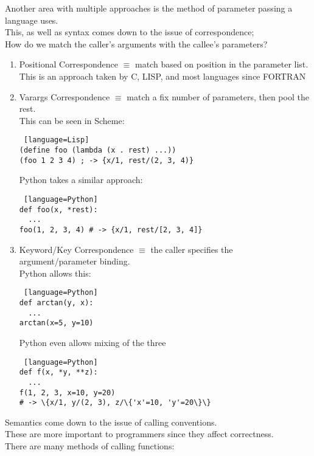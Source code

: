 \documentclass[../../lecture_notes.tex]{subfiles}
\begin{document}
Another area with multiple approaches is the method of parameter passing a language uses.\\
This, as well as syntax comes down to the issue of correspondence;\\
 How do we match the caller’s arguments with the callee’s parameters?
\begin{enumerate} [itemsep=0mm]
	\item Positional Correspondence $\equiv$ match based on position in the parameter list.\\
 		This is an approach taken by C, LISP, and most languages since FORTRAN
	\item Varargs Correspondence $\equiv$ match a fix number of parameters, then pool the rest.\\
		This can be seen in Scheme:
		\begin{lstlisting} [language=Lisp]
(define foo (lambda (x . rest) ...))
(foo 1 2 3 4) ; -> {x/1, rest/(2, 3, 4)}
		\end{lstlisting}
		Python takes a similar approach:
		\begin{lstlisting} [language=Python]
def foo(x, *rest):
  ...
foo(1, 2, 3, 4) # -> {x/1, rest/[2, 3, 4]}
		\end{lstlisting}
 	\item Keyword/Key Correspondence $\equiv$ the caller specifies the argument/parameter binding.\\
		Python allows this:
		\begin{lstlisting} [language=Python]
def arctan(y, x):
  ...
arctan(x=5, y=10)
		\end{lstlisting}
		Python even allows mixing of the three
		\begin{lstlisting} [language=Python]
def f(x, *y, **z):
  ...
f(1, 2, 3, x=10, y=20)
# -> \{x/1, y/(2, 3), z/\{'x'=10, 'y'=20\}\}
		\end{lstlisting} \smallskip
\end{enumerate}
\noindent Semantics come down to the issue of calling conventions.\\
These are more important to programmers since they affect correctness.\\
There are many methods of calling functions:
\end{document}
